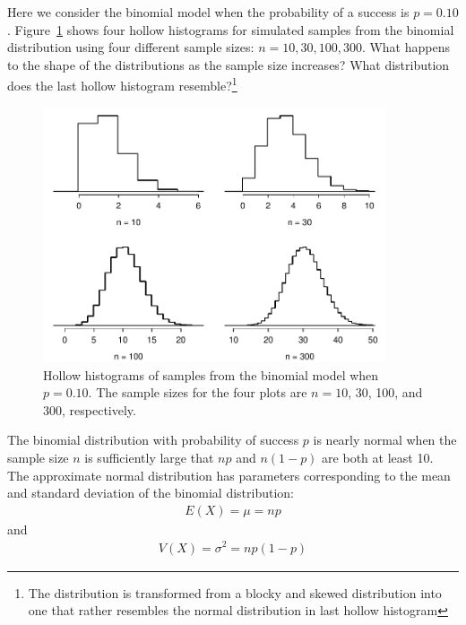 \begin{exercise}
Here we consider the binomial model when the probability of a success is $p=0.10$. Figure~\ref{fourBinomialModelsShowingApproxToNormal} shows four hollow histograms for simulated samples from the binomial distribution using four different sample sizes: $n=10, 30, 100, 300$. What happens to the shape of the distributions as the sample size increases? What distribution does the last hollow histogram resemble?\footnote{The distribution is transformed from a blocky and skewed distribution into one that rather resembles the normal distribution in last hollow histogram}
\end{exercise}

\begin{figure}[h]
\centering
\includegraphics[width=0.9\textwidth]{03/figures/fourBinomialModelsShowingApproxToNormal/fourBinomialModelsShowingApproxToNormal}
\caption{Hollow histograms of samples from the binomial model when $p=0.10$. The sample sizes for the four plots are $n=10$, 30, 100, and 300, respectively.}
\label{fourBinomialModelsShowingApproxToNormal}
\end{figure}

\begin{termBox}{
The binomial distribution with probability of success $p$ is nearly normal when the sample size $n$ is sufficiently large that $np$ and $n(1-p)$ are both at least 10. The approximate normal distribution has parameters corresponding to the mean and standard deviation of the binomial distribution:\vspace{-1.5mm}
\begin{align}
E(X) = \mu = np
\end{align}
and
\begin{align}
V(X) = \sigma^{2} = np(1-p)	\label{varianceBinomApproxNormal}
\end{align}
}
\end{termBox}




